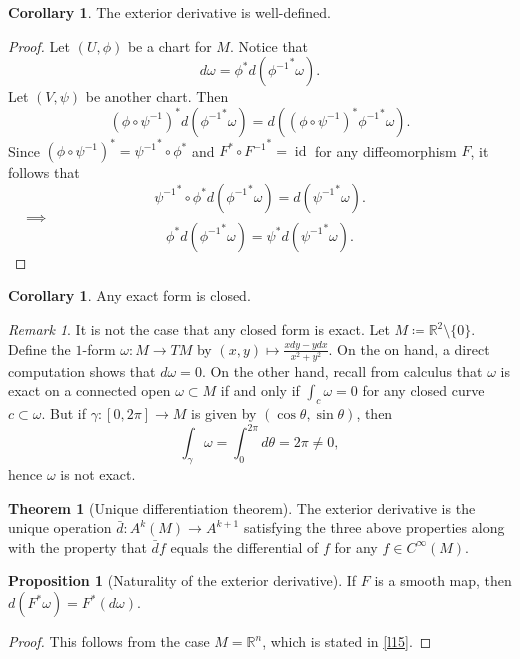 \documentclass[10pt,letterpaper,cm]{nupset}
\theoremstyle{definition}
\theoremstyle{theorem}
\newtheorem{theorem}[definition]{Theorem}
\newtheorem{prop}[definition]{Proposition}
\newtheorem{corollary}[definition]{Corollary}
\theoremstyle{remark}
\newtheorem{remark}[definition]{Remark}
\newcommand{\R}{\mathbb R}
\newcommand{\1}{\mathbf{1}}
\newcommand{\0}{\vec 0}
\DeclareMathOperator{\id}{id}
\begin{document}
\begin{corollary}
The exterior derivative is well-defined.
\end{corollary}
\begin{proof}
Let $(U, \phi)$ be a chart for $M$. Notice that $$d\omega = \phi^{\ast} d({\phi^{-1}}^{\ast}\omega).$$ Let $(V, \psi)$ be another chart. Then $$ (\phi \circ \psi^{-1})^{\ast} d({\phi^{-1}}^{\ast} \omega) =  d( (\phi \circ \psi^{-1})^{\ast}{\phi^{-1}}^{\ast} \omega).$$ Since $(\phi \circ \psi^{-1})^{\ast} = {\psi^{-1}}^{\ast} \circ \phi^{\ast}$ and $F^{\ast} \circ {F^{-1}}^{\ast}= \id$ for any diffeomorphism $F$, 
it follows that $${\psi^{-1}}^{\ast} \circ \phi^{\ast}d({\phi^{-1}}^{\ast} \omega) = d({\psi^{-1}}^{\ast} \omega).$$ $\quad \implies$  $$\phi^{\ast}d({\phi^{-1}}^{\ast} \omega) = \psi^{\ast} d({\psi^{-1}}^{\ast} \omega).$$
\end{proof}

\begin{corollary}
Any exact form is closed.
\end{corollary}

\begin{remark}\label{ce}
It is not the case that any closed form is exact. Let $M\coloneqq  \R^2 \setminus \{0\}$. Define the $1$-form $\omega : M \to TM$ by $(x, y) \mapsto \frac{xdy - y dx}{x^2 + y^2}$. On the on hand, a direct computation shows that $d \omega =0$. On the other hand, recall from calculus that $\omega$ is exact on a connected open $\omega \subset M$ if and only if $\int_c \omega =0$ for any closed curve $c \subset \omega$. But if $\gamma : [0, 2\pi] \to M$ is given by $(\cos \theta, \sin \theta)$, then  $$ \int_{\gamma} \omega = \int_{0}^{2\pi} d\theta = 2\pi \ne 0 ,$$ hence $\omega$ is not exact.
\end{remark}

\begin{theorem}[Unique differentiation theorem]
The exterior derivative is the unique operation $\bar{d} : A^k(M) \to A^{k+1}$ satisfying the three above properties along with the property that $\bar{d} f $ equals the differential of $f$ for any $f \in C^{\infty}(M)$.
\end{theorem}

\begin{prop}[Naturality of the exterior derivative]\label{natural}
If $F$ is a smooth map, then $d(F^{\ast} \omega) = F^{\ast}(d \omega).$
\end{prop}
\begin{proof}
This follows from the case $M = \R^n$, which is stated in \cref{l15}.
\end{proof}
\end{document}
